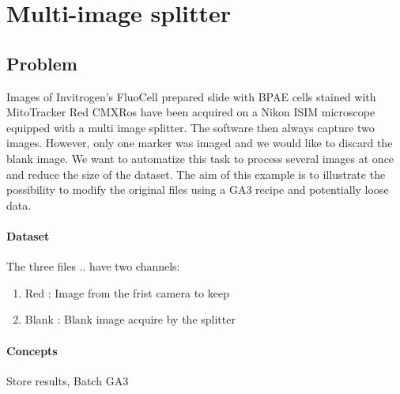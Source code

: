 \section{Multi-image splitter}

\subsection*{Problem}

Images of Invitrogen's FluoCell prepared slide with BPAE cells stained with MitoTracker Red CMXRos have been acquired on a Nikon ISIM microscope equipped with a multi image splitter. The software then always capture two images. However, only one marker was imaged and we would like to discard the blank image. We want to automatize this task to process several images at once and reduce the size of the dataset. The aim of this example is to illustrate the possibility to modify the original files using a GA3 recipe and potentially loose data.

\paragraph{Dataset} The three files  ..  have two channels:
    \begin{enumerate}
        \item Red : Image from the frist camera to keep
        \item Blank : Blank image acquire by the splitter
    \end{enumerate}

\paragraph{Concepts} 
Store results, 
Batch GA3

